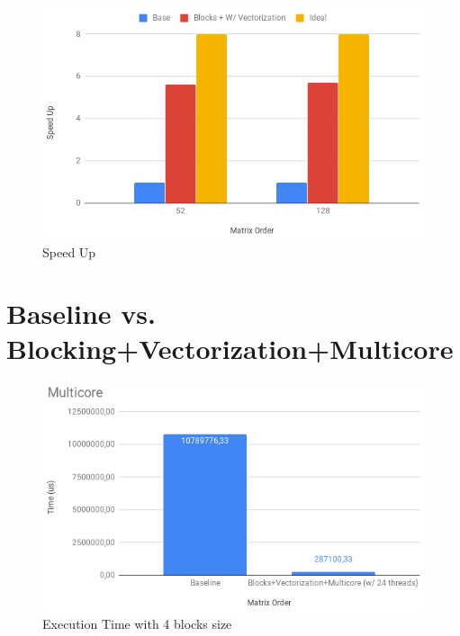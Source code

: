 \documentclass{article}
\begin{document}
\begin{appendices}
\begin{figure}[H]
    \centering
    \includegraphics[width=15cm]{Pictures/speedUpVec.png}
    \caption{Speed Up}
    \label{fig:speedUpVec}
\end{figure}

\section{Baseline vs. Blocking+Vectorization+Multicore}
\begin{figure}[H]
    \centering
    \includegraphics[width=15cm]{Pictures/exeTimeMulti.png}
    \caption{Execution Time with 4 blocks size}
    \label{fig:exeTimeMulti}
\end{figure}


\end{appendices}
\end{document}
